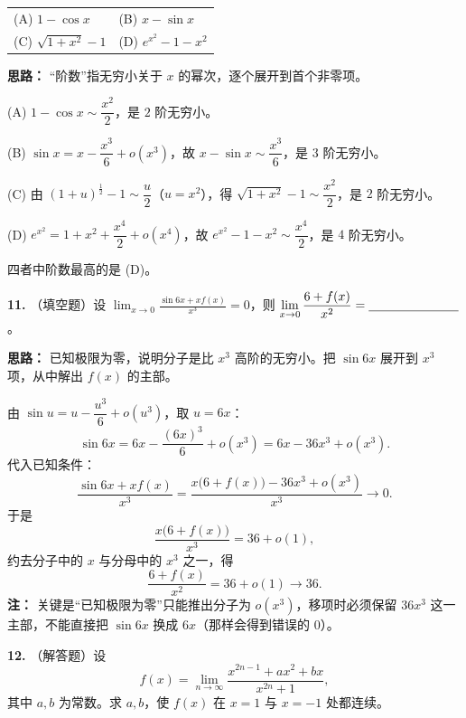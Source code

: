 \begin{center}
\begin{tabular}{ll}
(A) $1-\cos x$ & (B) $x-\sin x$ \\[4pt]
(C) $\sqrt{1+x^2}-1$ & (D) $e^{x^2}-1-x^2$
\end{tabular}
\end{center}

\ifshowsolutions%
\textbf{思路：} “阶数”指无穷小关于 $x$ 的幂次，逐个展开到首个非零项。

(A) $1-\cos x\sim\dfrac{x^2}{2}$，是 $2$ 阶无穷小。

(B) $\sin x=x-\dfrac{x^3}{6}+o(x^3)$，故 $x-\sin x\sim\dfrac{x^3}{6}$，是 $3$ 阶无穷小。

(C) 由 $(1+u)^{\frac12}-1\sim\dfrac{u}{2}$（$u=x^2$），得 $\sqrt{1+x^2}-1\sim\dfrac{x^2}{2}$，是 $2$ 阶无穷小。

(D) $e^{x^2}=1+x^2+\dfrac{x^4}{2}+o(x^4)$，故 $e^{x^2}-1-x^2\sim\dfrac{x^4}{2}$，是 $4$ 阶无穷小。

四者中阶数最高的是 (D)。


\else \answerarea[8] \fi%

\textbf{11.} （填空题）设 $\displaystyle\lim_{x\to0}\frac{\sin 6x+xf(x)}{x^3}=0$，则 $\displaystyle\lim_{x\to0}\frac{6+f(x)}{x^2}=\underline{\hspace{2.5cm}}$。

\ifshowsolutions%
\textbf{思路：} 已知极限为零，说明分子是比 $x^3$ 高阶的无穷小。把 $\sin 6x$ 展开到 $x^3$ 项，从中解出 $f(x)$ 的主部。

由 $\sin u=u-\dfrac{u^3}{6}+o(u^3)$，取 $u=6x$：
\[
\sin 6x=6x-\frac{(6x)^3}{6}+o(x^3)=6x-36x^3+o(x^3).
\]
代入已知条件：
\[
\frac{\sin 6x+xf(x)}{x^3}
=\frac{x\bigl(6+f(x)\bigr)-36x^3+o(x^3)}{x^3}\to0 .
\]
于是
\[
\frac{x\bigl(6+f(x)\bigr)}{x^3}=36+o(1),
\]
约去分子中的 $x$ 与分母中的 $x^3$ 之一，得
\[
\frac{6+f(x)}{x^2}=36+o(1)\longrightarrow 36 .
\]
\textbf{注：} 关键是“已知极限为零”只能推出分子为 $o(x^3)$，移项时必须保留 $36x^3$ 这一主部，不能直接把 $\sin 6x$ 换成 $6x$（那样会得到错误的 $0$）。


\else \answerarea[8] \fi%

\textbf{12.} （解答题）设
\[
f(x)=\lim_{n\to\infty}\frac{x^{2n-1}+ax^2+bx}{x^{2n}+1},
\]
其中 $a,b$ 为常数。求 $a,b$，使 $f(x)$ 在 $x=1$ 与 $x=-1$ 处都连续。

